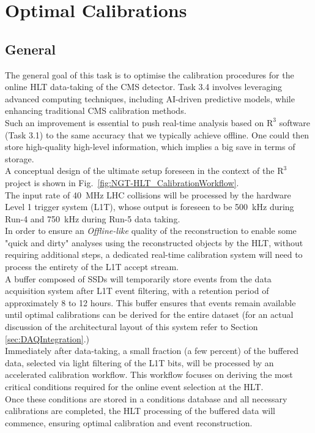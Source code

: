 \chapter{Optimal Calibrations}
\section{General} %

The general goal of this task is to optimise the calibration procedures for the online HLT data-taking of the CMS detector. Task 3.4 involves leveraging advanced computing techniques, including AI-driven predictive models, while enhancing traditional CMS calibration methods. \\
Such an improvement is essential to push real-time analysis based on $\mathrm{R}^3$ software (Task 3.1) to the same accuracy that we typically achieve offline. One could then store high-quality high-level information, which implies a big save in terms of storage.\\
\newline
A conceptual design of the ultimate setup foreseen in the context of the $\mathrm{R}^3$  project is shown in  Fig.~\ref{fig:NGT-HLT_CalibrationWorkflow}. \\
The input rate of \SI{40}{\mega\hertz} LHC collisions will be processed by the hardware Level 1 trigger system (L1T), whose output is foreseen to be \SI{500}{\kilo\hertz} during Run-\num{4} and \SI{750}{\kilo\hertz} during Run-\num{5} data taking. \\
\newline
In order to ensure an \emph{Offline-like} quality of the reconstruction to enable some "quick and dirty" analyses using the reconstructed objects by the HLT, without requiring additional steps, a dedicated real-time calibration system will need to process the entirety of the L1T accept stream.\\  
A buffer composed of SSDs will temporarily store events from the data acquisition system after L1T event filtering, with a retention period of approximately 8 to 12 hours. This buffer ensures that events remain available until optimal calibrations can be derived for the entire dataset (for an actual discussion of the architectural layout of this system refer to Section \ref{sec:DAQIntegration}.)\\
\newline
Immediately after data-taking, a small fraction (a few percent) of the buffered data, selected via light filtering of the L1T bits, will be processed by an accelerated calibration workflow. This workflow focuses on deriving the most critical conditions required for the online event selection at the HLT.\\
Once these conditions are stored in a conditions database and all necessary calibrations are completed, the HLT processing of the buffered data will commence, ensuring optimal calibration and event reconstruction. 

